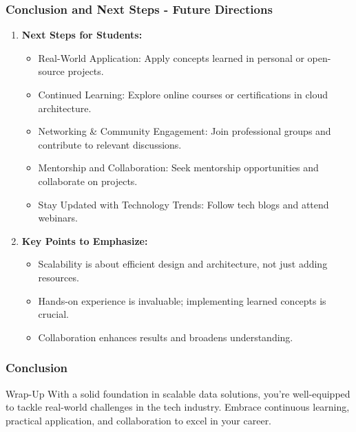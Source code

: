 \documentclass[aspectratio=169]{beamer}
\begin{document}
\begin{frame}[fragile]
    \frametitle{Conclusion and Next Steps - Future Directions}

    \begin{enumerate}[resume]
        \item \textbf{Next Steps for Students:}
        \begin{itemize}
            \item Real-World Application: Apply concepts learned in personal or open-source projects.
            \item Continued Learning: Explore online courses or certifications in cloud architecture.
            \item Networking \& Community Engagement: Join professional groups and contribute to relevant discussions.
            \item Mentorship and Collaboration: Seek mentorship opportunities and collaborate on projects.
            \item Stay Updated with Technology Trends: Follow tech blogs and attend webinars.
        \end{itemize}

        \item \textbf{Key Points to Emphasize:}
        \begin{itemize}
            \item Scalability is about efficient design and architecture, not just adding resources.
            \item Hands-on experience is invaluable; implementing learned concepts is crucial.
            \item Collaboration enhances results and broadens understanding.
        \end{itemize}
    \end{enumerate}
\end{frame}

\begin{frame}[fragile]
    \frametitle{Conclusion}
    
    \begin{block}{Wrap-Up}
        With a solid foundation in scalable data solutions, you're well-equipped to tackle real-world challenges in the tech industry. Embrace continuous learning, practical application, and collaboration to excel in your career.
    \end{block}
\end{frame}
\end{document}
